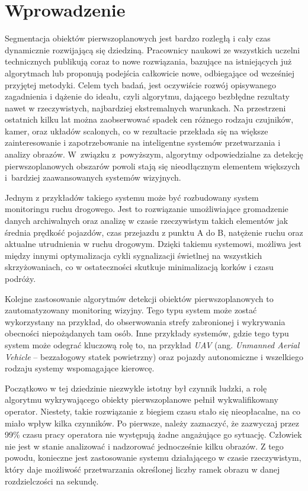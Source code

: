 \chapter{Wprowadzenie}
\label{cha:wprowadzenie}

Segmentacja obiektów pierwszoplanowych jest bardzo rozległą i cały czas dynamicznie rozwijającą się dziedziną. Pracownicy naukowi ze wszystkich uczelni technicznych publikują coraz to nowe rozwiązania, bazujące na istniejących już algorytmach lub proponują podejścia całkowicie nowe, odbiegające od wcześniej przyjętej metodyki.  Celem tych badań, jest oczywiście rozwój opisywanego zagadnienia i dążenie do ideału, czyli algorytmu, dającego bezbłędne rezultaty nawet w rzeczywistych, najbardziej ekstremalnych warunkach. Na przestrzeni ostatnich kilku lat można zaobserwować spadek cen różnego rodzaju czujników, kamer, oraz układów scalonych, co w rezultacie przekłada się na większe zainteresowanie i zapotrzebowanie na inteligentne systemów przetwarzania i analizy obrazów. W~związku z~powyższym, algorytmy odpowiedzialne za detekcję pierwszoplanowych obszarów powoli stają się nieodłącznym elementem większych i~bardziej zaawansowanych systemów wizyjnych. 

Jednym z przykładów takiego systemu może być rozbudowany system monitoringu ruchu drogowego. Jest to rozwiązanie umożliwiające gromadzenie danych archiwalnych oraz analizę w czasie rzeczywistym takich elementów jak średnia prędkość pojazdów, czas przejazdu z punktu A do B, natężenie ruchu oraz aktualne utrudnienia w ruchu drogowym. Dzięki takiemu systemowi, możliwa jest między innymi optymalizacja cykli sygnalizacji świetlnej na wszystkich skrzyżowaniach, co w ostateczności skutkuje minimalizacją korków i czasu podróży.   

Kolejne zastosowanie algorytmów detekcji obiektów pierwszoplanowych to zautomatyzowany monitoring wizyjny. Tego typu system może zostać wykorzystany na przykład, do obserwowania strefy zabronionej i wykrywania obecności niepożądanych tam osób. Inne przykłady systemów, gdzie tego typu system może odegrać kluczową rolę to, na przykład \textit{UAV} (ang. \textit{Unmanned Aerial Vehicle} -- bezzałogowy statek powietrzny) oraz pojazdy autonomiczne i wszelkiego rodzaju systemy wspomagające kierowcę.

Początkowo w tej dziedzinie niezwykle istotny był czynnik ludzki, a rolę algorytmu wykrywającego obiekty pierwszoplanowe pełnił wykwalifikowany operator. Niestety, takie rozwiązanie z biegiem czasu stało się nieopłacalne, na co miało wpływ kilka czynników. Po pierwsze, należy zaznaczyć, że zazwyczaj przez 99\% czasu pracy operatora nie występują żadne angażujące go sytuację. Człowiek nie jest w stanie analizować i nadzorować jednocześnie kilku obrazów. Z tego powodu, konieczne jest zastosowanie systemu działającego w czasie rzeczywistym, który daje możliwość przetwarzania określonej liczby ramek obrazu w danej rozdzielczości na sekundę.

